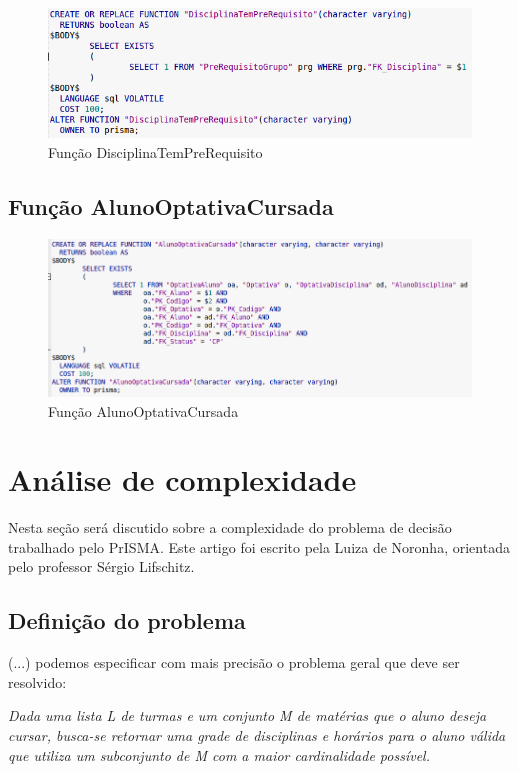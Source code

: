 \documentclass[graduacao,brazil]{ThesisPUC}
\begin{document}
\begin{figure}[H]
    \centering
    \includegraphics[width=0.9\linewidth]{img/v3_func_discplinaprerequisito.png}
    \caption{Função DisciplinaTemPreRequisito}
\end{figure}

\section{Função AlunoOptativaCursada}

\begin{figure}[H]
    \centering
    \includegraphics[width=\linewidth]{img/v3_func_optativacursada.png}
    \caption{Função AlunoOptativaCursada}
\end{figure}



\chapter{Análise de complexidade}

Nesta seção será discutido sobre a complexidade do problema de decisão trabalhado pelo PrISMA. Este artigo foi escrito pela Luiza de Noronha, orientada pelo professor Sérgio Lifschitz.

\section{Definição do problema}

(...) podemos especificar com mais precisão o problema geral que deve ser resolvido:

\vspace{3 mm}
\textit{Dada uma lista L de turmas e um conjunto M de matérias que o aluno deseja cursar, busca-se retornar uma grade de disciplinas e horários para o aluno válida que utiliza um subconjunto de M com a maior cardinalidade possível.}
\vspace{3 mm}
\end{document}
